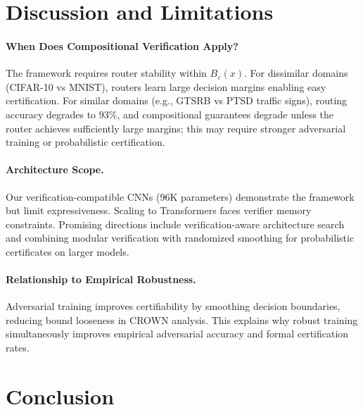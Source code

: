 \documentclass{article}
\theoremstyle{plain}
\theoremstyle{remark}
\begin{document}
\section{Discussion and Limitations}
\label{sec:limitations}

\paragraph{When Does Compositional Verification Apply?} The framework requires router stability within $B_\varepsilon(x)$. For dissimilar domains (CIFAR-10 vs MNIST), routers learn large decision margins enabling easy certification. For similar domains (e.g., GTSRB vs PTSD traffic signs), routing accuracy degrades to 93\%, and compositional guarantees degrade unless the router achieves sufficiently large margins; this may require stronger adversarial training or probabilistic certification.

\paragraph{Architecture Scope.} Our verification-compatible CNNs (96K parameters) demonstrate the framework but limit expressiveness. Scaling to Transformers faces verifier memory constraints. Promising directions include verification-aware architecture search and combining modular verification with randomized smoothing for probabilistic certificates on larger models.

\paragraph{Relationship to Empirical Robustness.} Adversarial training improves certifiability by smoothing decision boundaries, reducing bound looseness in CROWN analysis. This explains why robust training simultaneously improves empirical adversarial accuracy and formal certification rates.

\section{Conclusion}
\end{document}
